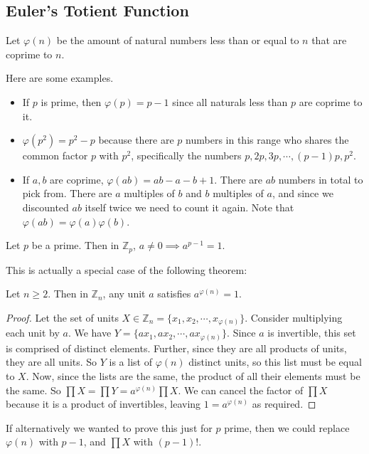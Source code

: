 \documentclass{article}
\begin{document}
	\subsection{Euler's Totient Function}
	\begin{definition}
		Let $\varphi(n)$ be the amount of natural numbers less than or equal to $n$ that are coprime to $n$.
	\end{definition}
	Here are some examples.
	\begin{itemize}
		\item If $p$ is prime, then $\varphi(p) = p - 1$ since all naturals less than $p$ are coprime to it.
		\item $\varphi(p^2) = p^2 - p$ because there are $p$ numbers in this range who shares the common factor $p$ with $p^2$, specifically the numbers $p, 2p, 3p, \cdots, (p-1)p, p^2$.
		\item If $a, b$ are coprime, $\varphi(ab) = ab - a - b + 1$. There are $ab$ numbers in total to pick from. There are $a$ multiples of $b$ and $b$ multiples of $a$, and since we discounted $ab$ itself twice we need to count it again. Note that $\varphi(ab) = \varphi(a)\varphi(b)$.
	\end{itemize}

	\begin{theorem}
		Let $p$ be a prime. Then in $\mathbb Z_p$, $a \neq 0 \implies a^{p-1} = 1$.
	\end{theorem}
	\noindent This is actually a special case of the following theorem:
	\begin{theorem}
		Let $n \geq 2$. Then in $\mathbb Z_n$, any unit $a$ satisfies $a^{\varphi(n)} = 1$.
	\end{theorem}
	\begin{proof}
		Let the set of units $X \in \mathbb Z_n = \{ x_1, x_2, \cdots, x_{\varphi(n)} \}$. Consider multiplying each unit by $a$. We have $Y = \{ ax_1, ax_2, \cdots, ax_{\varphi(n)} \}$. Since $a$ is invertible, this set is comprised of distinct elements. Further, since they are all products of units, they are all units. So $Y$ is a list of $\varphi(n)$ distinct units, so this list must be equal to $X$. Now, since the lists are the same, the product of all their elements must be the same. So $\prod X = \prod Y = a^{\varphi(n)}\prod X$. We can cancel the factor of $\prod X$ because it is a product of invertibles, leaving $1 = a^{\varphi(n)}$ as required.
	\end{proof}
	If alternatively we wanted to prove this just for $p$ prime, then we could replace $\varphi(n)$ with $p-1$, and $\prod X$ with $(p-1)!$.
	
\end{document}
